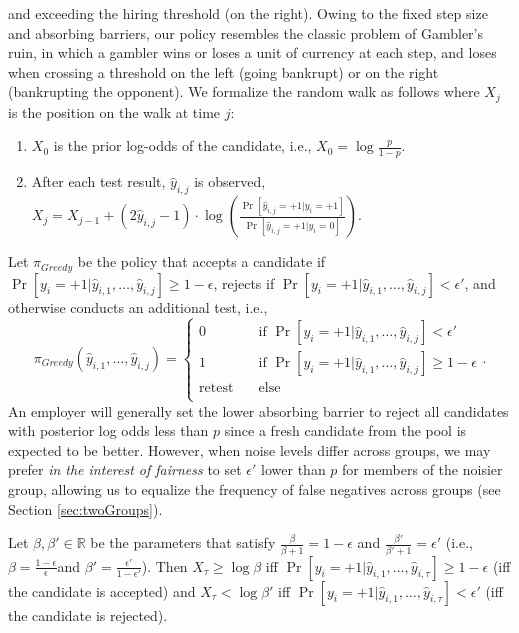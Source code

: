 and exceeding the hiring threshold (on the right).
Owing to the fixed step size and absorbing barriers,
our policy resembles the classic problem of Gambler's ruin,
in which a gambler wins or loses a unit of currency at each step,
and loses when crossing a threshold on the left (going bankrupt)
or on the right (bankrupting the opponent).
We formalize the random walk as follows where $X_j$
is the position on the walk at time $j$:
\begin{enumerate}
    \item $X_0$ is the prior log-odds of the candidate, i.e., $X_0=\log \frac{p}{1-p}$.
    \item After each test result, $\hat{y}_{i,j}$ is observed,
    $X_j=X_{j-1}+(2\hat{y}_{i,j}-1)\cdot
    \log \left(\frac{\Pr[\hat{y}_{i,j}=+1|y_i=+1]}{\Pr[\hat{y}_{i,j}=+1|y_i=0]}\right)$.
\end{enumerate}
Let $\pi_{Greedy}$ be the policy that accepts a candidate if $\Pr[y_i=+1|\hat{y}_{i,1},\dots,\hat{y}_{i,j}]\geq 1-\epsilon$, 
rejects if $\Pr[y_i=+1|\hat{y}_{i,1},\dots,\hat{y}_{i,j}]<\epsilon'$,
and otherwise conducts an additional test, i.e.,
\[
\pi_{Greedy}(\hat{y}_{i,1},\dots,\hat{y}_{i,j})=
 \begin{cases}
       0    &\quad\text{if } \Pr[y_i=+1|\hat{y}_{i,1},\dots,\hat{y}_{i,j}]<\epsilon' \\
       1    &\quad\text{if } \Pr[y_i=+1|\hat{y}_{i,1},\dots,\hat{y}_{i,j}]\geq 1-\epsilon\\
       \text{retest}    &\quad\text{else}\\
     \end{cases}.
\]
An employer will generally set
the lower absorbing barrier
to reject all candidates with posterior log odds less than $p$ 
since a fresh candidate from the pool is expected to be better.
However, when noise levels differ across groups,
we may prefer \emph{in the interest of fairness} 
to set $\epsilon'$ lower than $p$ for members of the noisier group, 
allowing us to equalize the frequency of false negatives across groups (see Section \ref{sec:twoGroups}).


\begin{lemma}\label{lemma:beta}
Let $\beta,\beta'\in \mathbb{R}$ be the parameters that satisfy $\frac{\beta}{\beta+1}=1-\epsilon$ and $\frac{\beta'}{\beta'+1}=\epsilon'$
(i.e., $\beta=\frac{1-\epsilon}{\epsilon}$and $\beta'=\frac{\epsilon'}{1-\epsilon'}$).
Then $X_{\tau}\geq \log \beta$ 
iff $\Pr[y_i=+1|\hat{y}_{i,1},\dots,\hat{y}_{i,\tau} ] \geq 1-\epsilon$ 
(iff the candidate is accepted) and $X_{\tau}< \log \beta'$ 
iff $\Pr[y_i=+1|\hat{y}_{i,1},\dots,\hat{y}_{i,\tau} ] < \epsilon'$ 
(iff the candidate is rejected).
\end{lemma}

